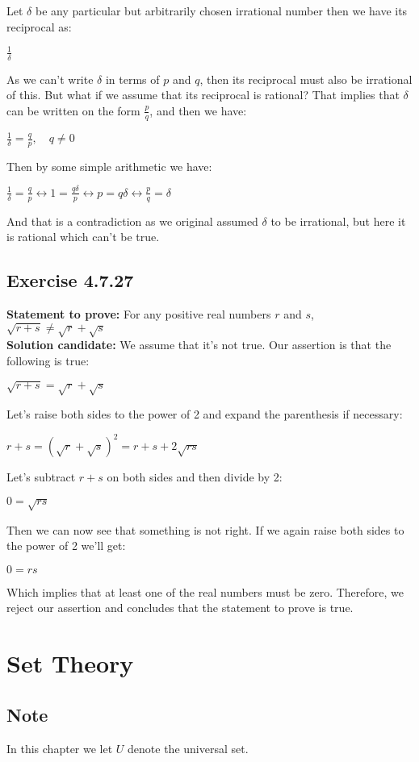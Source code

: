 \documentclass{report}
\newcommand{\cent}[1]{\begin{center}#1\end{center}}
\newcommand{\Prove}{\textbf{Statement to prove: }}
\newcommand{\solution}{\textbf{Solution candidate: }}
\newcommand{\QED}{\boxed{}}
\newcommand{\Section}[1]{\section{#1}}
\newcommand{\Exercise}[1]{\subsection{Exercise #1}}
\begin{document}
	Let $\delta$ be any particular but arbitrarily chosen irrational number then we have its reciprocal as:
	
	\cent{$\frac{1}{\delta}$}
	
	As we can't write $\delta$ in terms of $p$ and $q$, then its reciprocal must also be irrational of this. But what if we assume that its reciprocal is rational? That implies that $\delta$ can be written on the form $\frac{p}{q}$, and then we have:
	
	\cent{$\frac{1}{\delta} = \frac{q}{p}, \quad q \neq 0$}
	
	Then by some simple arithmetic we have:
	
	\cent{$\frac{1}{\delta} = \frac{q}{p} \leftrightarrow 1=\frac{q\delta}{p} \leftrightarrow p = q \delta  \leftrightarrow \frac{p}{q} = \delta$}
	
	And that is a contradiction as we original assumed $\delta$ to be irrational, but here it is rational which can't be true.\\
	\QED
	
	\Exercise{4.7.27}
	
	\Prove
	For any positive real numbers $r$ and $s$, $\sqrt{r+s} \neq \sqrt{r} + \sqrt{s}$\\
	
	\solution
	We assume that it's not true. Our assertion is that the following is true:
	
	\cent{$\sqrt{r+s} = \sqrt{r} + \sqrt{s}$}
	
	Let's raise both sides to the power of 2 and expand the parenthesis if necessary:
	
	\cent{$r + s = (\sqrt{r} + \sqrt{s})^{2} = r + s + 2 \sqrt{rs}$}
	
	Let's subtract $r+s$ on both sides and then divide by 2:
	
	\cent{$0 = \sqrt{rs}$}
	
	Then we can now see that something is not right. If we again raise both sides to the power of 2 we'll get:
	
	\cent{$0 = rs$}
	
	Which implies that at least one of the real numbers must be zero. Therefore, we reject our assertion and concludes that the statement to prove is true.\\
	\QED
	\Section{Set Theory}
	\subsection*{Note}
	In this chapter we let $U$ denote the universal set.
	
\end{document}
